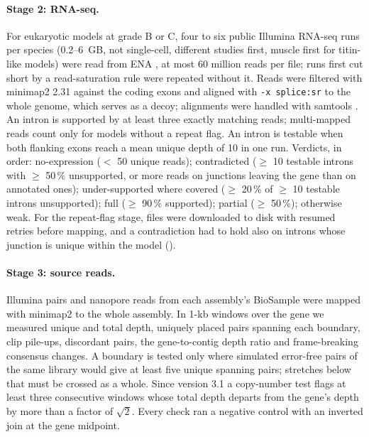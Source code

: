 \documentclass[11pt]{article}
\begin{document}
\paragraph{Stage 2: RNA-seq.} For eukaryotic models at grade B or C, four to six public Illumina RNA-seq runs per
species (0.2--6~GB, not single-cell, different studies first, muscle first for titin-like models) were read from ENA
\citep{yuan2026}, at most 60 million reads per file; runs first cut short by a read-saturation rule were repeated without
it. Reads were filtered
with minimap2 2.31 \citep{li2018} against the coding exons and aligned with \texttt{-x splice:sr} to the whole genome,
which serves as a decoy; alignments were handled with samtools \citep{danecek2021}. An intron is supported by at least
three exactly matching reads; multi-mapped reads count only for models without a repeat flag. An intron is testable when
both flanking exons reach a mean unique depth of 10 in one run. Verdicts, in order: no-expression ($<$ 50 unique reads);
contradicted ($\geq$ 10 testable introns with $\geq$ 50\,\% unsupported, or more reads on junctions leaving the gene than
on annotated ones); under-supported where covered ($\geq$ 20\,\% of $\geq$ 10 testable introns unsupported); full
($\geq$ 90\,\% supported); partial ($\geq$ 50\,\%); otherwise weak. For the repeat-flag stage, files were downloaded to
disk with resumed retries before mapping, and a contradiction had to hold also on introns whose junction is unique within
the model ().

\paragraph{Stage 3: source reads.} Illumina pairs and nanopore reads from each assembly's BioSample were mapped with
minimap2 to the whole assembly. In 1-kb windows over the gene we measured unique and total depth, uniquely placed pairs
spanning each boundary, clip pile-ups, discordant pairs, the gene-to-contig depth ratio and frame-breaking consensus
changes. A boundary is tested only where simulated error-free pairs of the same library would give at least five unique
spanning pairs; stretches below that must be crossed as a whole. Since version 3.1 a copy-number test flags at least three
consecutive windows whose total depth departs from the gene's depth by more than a factor of $\sqrt{2}$. Every check ran a
negative control with an inverted join at the gene midpoint.
\end{document}

